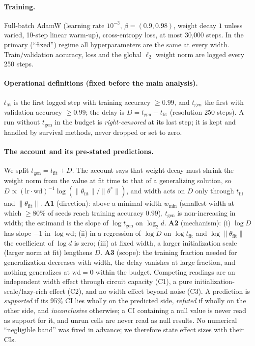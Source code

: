\documentclass{article}
\newcommand{\tfit}{t_{\mathrm{fit}}}
\newcommand{\tgen}{t_{\mathrm{gen}}}
\begin{document}
\paragraph{Training.}
Full-batch AdamW \citep{loshchilov2017decoupled} (learning rate $10^{-3}$, $\beta=(0.9,0.98)$, weight decay $1$ unless varied, 10-step linear warm-up), cross-entropy loss, at most 30{,}000 steps.
In the primary (``fixed'') regime all hyperparameters are the same at every width.
Train/validation accuracy, loss and the global $\ell_2$ weight norm are logged every 250 steps.

\paragraph{Operational definitions (fixed before the main analysis).}
$\tfit$ is the first logged step with training accuracy $\ge 0.99$, and $\tgen$ the first with validation accuracy $\ge 0.99$; the delay is $D=\tgen-\tfit$ (resolution 250 steps).
A run without $\tgen$ in the budget is \emph{right-censored} at its last step; it is kept and handled by survival methods, never dropped or set to zero.


\paragraph{The account and its pre-stated predictions.}
We split $\tgen=\tfit+D$. The account says that weight decay must shrink the weight norm from the value at fit time to that of a generalizing solution, so $D\propto(\mathrm{lr}\cdot\mathrm{wd})^{-1}\log(\lVert\theta_{\text{fit}}\rVert/\lVert\theta^\ast\rVert)$, and width acts on $D$ only through $\tfit$ and $\lVert\theta_{\text{fit}}\rVert$.
\textbf{A1} (direction): above a minimal width $w_{\min}$ (smallest width at which $\ge80\%$ of seeds reach training accuracy $0.99$), $\tgen$ is non-increasing in width; the estimand is the slope of $\log\tgen$ on $\log_2 d$.
\textbf{A2} (mechanism): (i) $\log D$ has slope $-1$ in $\log\mathrm{wd}$; (ii) in a regression of $\log D$ on $\log\tfit$ and $\log\lVert\theta_{\text{fit}}\rVert$ the coefficient of $\log d$ is zero; (iii) at fixed width, a larger initialization scale (larger norm at fit) lengthens $D$.
\textbf{A3} (scope): the training fraction needed for generalization decreases with width, the delay vanishes at large fraction, and nothing generalizes at $\mathrm{wd}=0$ within the budget.
Competing readings are an independent width effect through circuit capacity (C1), a pure initialization-scale/lazy-rich effect (C2), and no width effect beyond noise (C3).
A prediction is \emph{supported} if its 95\% CI lies wholly on the predicted side, \emph{refuted} if wholly on the other side, and \emph{inconclusive} otherwise; a CI containing a null value is never read as support for it, and unrun cells are never read as null results.
No numerical ``negligible band'' was fixed in advance; we therefore state effect sizes with their CIs.
\end{document}
